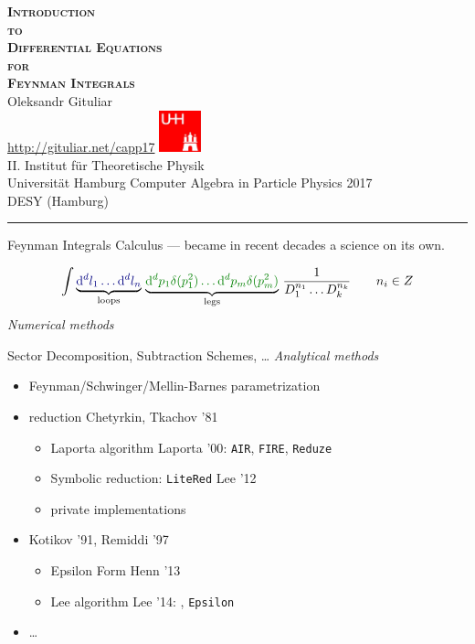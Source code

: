 \documentclass[11pt]{article}
\newcommand{\titleb}[2]{{\color{Blue}{\LARGE #1}\hfill{\Large #2}\vspace{-2mm}\par\rule{\textwidth}{1pt}\vs}}
\newcommand{\titlea}[1]{\titleb{#1}{}}
\newcommand{\people}[1]{{\color{Magenta}#1}}
\begin{document}
\color{text}

\begin{center}
  \mbox{}
  \vfill
  {\LARGE \bf \scshape Introduction \\ \Large to \LARGE \\ Differential Equations \\ \Large for \LARGE \\ Feynman Integrals \\}
  \vfill
  {\large Oleksandr Gituliar} \\ \href{http://gituliar.net/capp17}{http://gituliar.net/capp17}
  \vfill
  \includegraphics[height=1.2cm]{img/logo_uhh}\\
  II. Institut f\"ur Theoretische Physik \\ Universit\"at Hamburg
  \vfill
  {Computer Algebra in Particle Physics 2017 \\ DESY (Hamburg)}
  \vfill
  \mbox{}
\end{center}
\newpage


\titlea{Introduction}

Feynman Integrals Calculus --- became in recent decades a science on its own. 

  \begin{equation*}
    \int {\color{Black}\underbrace{ \color{NavyBlue}\D^d l_1 \ldots \D^d l_n}_{\text{loops}}} \,\, 
         {\color{Black}\underbrace{\color{Green} \D^d p_1 \delta(p_1^2) \ldots \D^d p_m \delta(p_m^2)}_{\text{legs}}} \,\, \frac{1}{D_1^{n_1} \ldots D_k^{n_k}}
         \qquad n_i \in Z
  \end{equation*}
    {\em Numerical methods}
    \bi
       \item Sector Decomposition, Subtraction Schemes, \ldots
    \ei
    {\em Analytical methods}
    \begin{itemize}
      \item Feynman/Schwinger/Mellin-Barnes parametrization
      \item {} reduction \people{Chetyrkin, Tkachov '81}
      \begin{itemize}
        \item Laporta algorithm \people{Laporta '00}: \texttt{AIR}, \texttt{FIRE}, \texttt{Reduze}
        \item Symbolic reduction: \texttt{LiteRed} \people{Lee '12}
        \item private implementations
      \end{itemize}
      \item {} \people{Kotikov '91, Remiddi '97}
      \begin{itemize}
        \item Epsilon Form \people{Henn '13}
        \item Lee algorithm \people{Lee '14}: \fuchsia, \texttt{Epsilon}
      \end{itemize}
      \item \ldots
    \end{itemize}
\newpage
\end{document}
